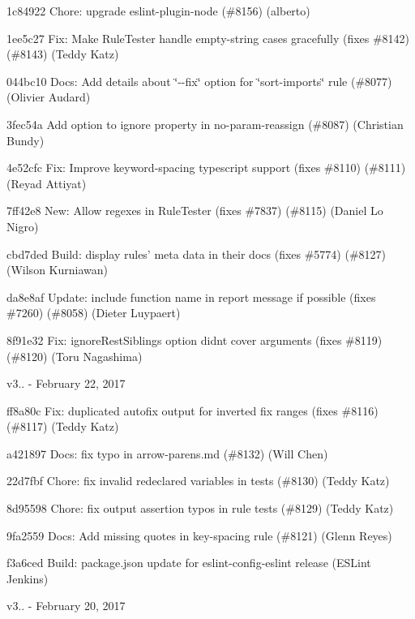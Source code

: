 \begin{DoxyItemize}
\item 1c84922 Chore\+: upgrade eslint-\/plugin-\/node (\#8156) (alberto)
\item 1ee5c27 Fix\+: Make Rule\+Tester handle empty-\/string cases gracefully (fixes \#8142) (\#8143) (Teddy Katz)
\item 044bc10 Docs\+: Add details about \char`\"{}-\/-\/fix\char`\"{} option for \char`\"{}sort-\/imports\char`\"{} rule (\#8077) (Olivier Audard)
\item 3fec54a Add option to ignore property in no-\/param-\/reassign (\#8087) (Christian Bundy)
\item 4e52cfc Fix\+: Improve keyword-\/spacing typescript support (fixes \#8110) (\#8111) (Reyad Attiyat)
\item 7ff42e8 New\+: Allow regexes in Rule\+Tester (fixes \#7837) (\#8115) (Daniel Lo Nigro)
\item cbd7ded Build\+: display rules’ meta data in their docs (fixes \#5774) (\#8127) (Wilson Kurniawan)
\item da8e8af Update\+: include function name in report message if possible (fixes \#7260) (\#8058) (Dieter Luypaert)
\item 8f91e32 Fix\+: {\ttfamily ignore\+Rest\+Siblings} option didn\textquotesingle{}t cover arguments (fixes \#8119) (\#8120) (Toru Nagashima)
\end{DoxyItemize}

v3.. -\/ February 22, 2017


\begin{DoxyItemize}
\item ff8a80c Fix\+: duplicated autofix output for inverted fix ranges (fixes \#8116) (\#8117) (Teddy Katz)
\item a421897 Docs\+: fix typo in arrow-\/parens.\+md (\#8132) (Will Chen)
\item 22d7fbf Chore\+: fix invalid redeclared variables in tests (\#8130) (Teddy Katz)
\item 8d95598 Chore\+: fix output assertion typos in rule tests (\#8129) (Teddy Katz)
\item 9fa2559 Docs\+: Add missing quotes in key-\/spacing rule (\#8121) (Glenn Reyes)
\item f3a6ced Build\+: package.\+json update for eslint-\/config-\/eslint release (E\+S\+Lint Jenkins)
\end{DoxyItemize}

v3.. -\/ February 20, 2017


